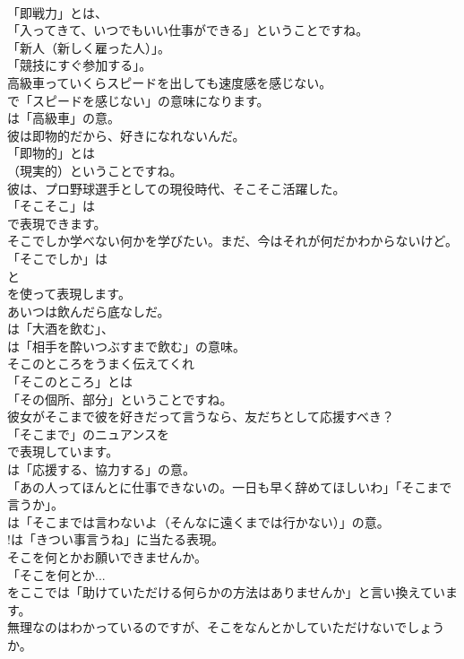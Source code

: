 \documentclass[8pt]{extreport}
\begin{document}
\begin{CJK}{UTF8}{min}
\\	「即戦力」とは、
\\	「入ってきて、いつでもいい仕事ができる」ということですね。
\\	「新人（新しく雇った人）」。
\\	「競技にすぐ参加する」。	
\\	高級車っていくらスピードを出しても速度感を感じない。 
\\	で「スピードを感じない」の意味になります。
\\	は「高級車」の意。	
\\	彼は即物的だから、好きになれないんだ。 
\\	「即物的」とは
\\	（現実的）ということですね。	
\\	彼は、プロ野球選手としての現役時代、そこそこ活躍した。 
\\	「そこそこ」は
\\	で表現できます。	
\\	そこでしか学べない何かを学びたい。まだ、今はそれが何だかわからないけど。 
\\	「そこでしか」は
\\	と
\\	を使って表現します。	
\\	あいつは飲んだら底なしだ。 
\\	は「大酒を飲む」、
\\	は「相手を酔いつぶすまで飲む」の意味。	
\\	そこのところをうまく伝えてくれ 
\\	「そこのところ」とは
\\	「その個所、部分」ということですね。	
\\	彼女がそこまで彼を好きだって言うなら、友だちとして応援すべき？ 
\\	「そこまで」のニュアンスを 
\\	で表現しています。
\\	は「応援する、協力する」の意。	
\\	「あの人ってほんとに仕事できないの。一日も早く辞めてほしいわ」「そこまで言うか」。 
\\	は「そこまでは言わないよ（そんなに遠くまでは行かない）」の意。
\\	!は「きつい事言うね」に当たる表現。	
\\	そこを何とかお願いできませんか。 
\\	「そこを何とか... 
\\	をここでは「助けていただける何らかの方法はありませんか」と言い換えています。	
\\	無理なのはわかっているのですが、そこをなんとかしていただけないでしょうか。 

\end{CJK}
\end{document}
